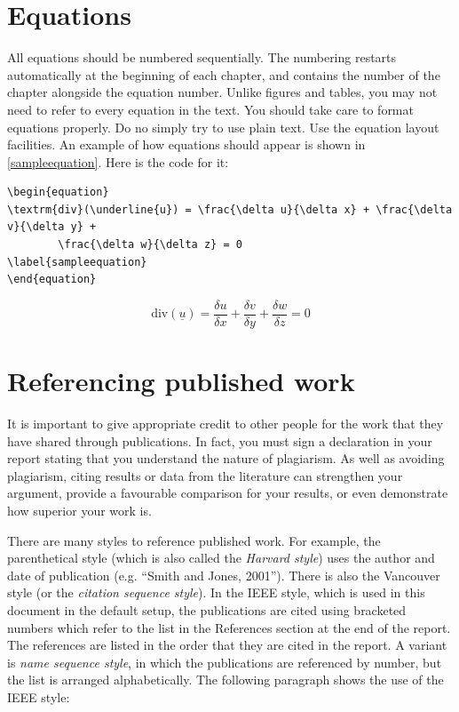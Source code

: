 \section{Equations}
All equations should be numbered sequentially. The numbering restarts automatically at the beginning of each chapter, and contains the number of the chapter alongside the equation number. Unlike figures and tables, you may not need to refer to every equation in the text. You should take care to format equations properly. Do no simply try to use plain text. Use the equation layout facilities. An example of how equations should appear is shown in \eqref{sampleequation}. Here is the code for it:

{\footnotesize
\begin{verbatim}
\begin{equation}
\textrm{div}(\underline{u}) = \frac{\delta u}{\delta x} + \frac{\delta v}{\delta y} +
        \frac{\delta w}{\delta z} = 0
\label{sampleequation}
\end{equation} 
\end{verbatim}
}

\begin{equation}
\textrm{div}(\underline{u}) = \frac{\delta u}{\delta x} + \frac{\delta v}{\delta y} + \frac{\delta w}{\delta z} = 0
\label{sampleequation}
\end{equation} 

\section{Referencing published work}
It is important to give appropriate credit to other people for the work that they have shared through publications. In fact, you must sign a declaration in your report stating that you understand the nature of plagiarism. As well as avoiding plagiarism, citing results or data from the literature can strengthen your argument, provide a favourable comparison for your results, or even demonstrate how superior your work is.

There are many styles to reference published work. For example, the parenthetical style (which is also called the \emph{Harvard style}) uses the author and date of publication (e.g. ``Smith and Jones, 2001''). There is also the Vancouver style (or the \emph{citation sequence style}). In the IEEE style, which is used in this document in the default setup, the publications are cited using bracketed numbers which refer to the list in the References section at the end of the report. The references are listed in the order that they are cited in the report. A variant is \emph{name sequence style}, in which the publications are referenced by number, but the list is arranged alphabetically. The following paragraph shows the use of the IEEE style: 

